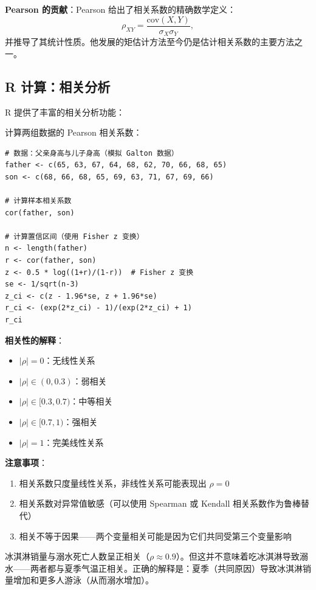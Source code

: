 \textbf{Pearson 的贡献}：Pearson 给出了相关系数的精确数学定义：
\[
\rho_{XY} = \frac{\text{cov}(X, Y)}{\sigma_X \sigma_Y},
\]
并推导了其统计性质。他发展的矩估计方法至今仍是估计相关系数的主要方法之一。

\subsection{R 计算：相关分析}

R 提供了丰富的相关分析功能：

\begin{example}[样本相关系数]\label{ex:sample-correlation-ch2}
计算两组数据的 Pearson 相关系数：
\begin{verbatim}
# 数据：父亲身高与儿子身高（模拟 Galton 数据）
father <- c(65, 63, 67, 64, 68, 62, 70, 66, 68, 65)
son <- c(68, 66, 68, 65, 69, 63, 71, 67, 69, 66)

# 计算样本相关系数
cor(father, son)

# 计算置信区间（使用 Fisher z 变换）
n <- length(father)
r <- cor(father, son)
z <- 0.5 * log((1+r)/(1-r))  # Fisher z 变换
se <- 1/sqrt(n-3)
z_ci <- c(z - 1.96*se, z + 1.96*se)
r_ci <- (exp(2*z_ci) - 1)/(exp(2*z_ci) + 1)
r_ci
\end{verbatim}
\end{example}

\textbf{相关性的解释}：
\begin{itemize}
\item $|\rho| = 0$：无线性关系
\item $|\rho| \in (0, 0.3)$：弱相关
\item $|\rho| \in [0.3, 0.7)$：中等相关
\item $|\rho| \in [0.7, 1)$：强相关
\item $|\rho| = 1$：完美线性关系
\end{itemize}

\textbf{注意事项}：
\begin{enumerate}
\item 相关系数只度量线性关系，非线性关系可能表现出 $\rho = 0$
\item 相关系数对异常值敏感（可以使用 Spearman 或 Kendall 相关系数作为鲁棒替代）
\item 相关不等于因果——两个变量相关可能是因为它们共同受第三个变量影响
\end{enumerate}

\begin{example}[相关与因果]\label{ex:correlation-causation-ch2}
冰淇淋销量与溺水死亡人数呈正相关（$\rho \approx 0.9$）。但这并不意味着吃冰淇淋导致溺水——两者都与夏季气温正相关。正确的解释是：夏季（共同原因）导致冰淇淋销量增加和更多人游泳（从而溺水增加）。
\end{example}

